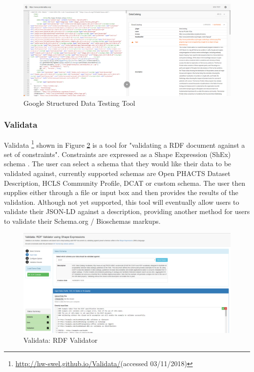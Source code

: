 \begin{figure}[h]
 \centering\includegraphics[scale=0.35]{images/google_testing.PNG}
   \caption{Google Structured Data Testing Tool}
   \label{fig:googleTool}
\end{figure}

\newpage
\subsubsection*{Validata}
Validata \footnote{\url{http://hw-swel.github.io/Validata/}(accessed 03/11/2018)} shown in Figure \ref{fig:validata} is a tool for "validating a RDF document against a set of constraints"\cite{hansen2015validata}. Constraints are expressed as a Shape Expression (ShEx) schema \cite{validataAG}. The user can select a schema that they would like their data to be validated against, currently supported schemas are Open PHACTS Dataset Description, HCLS Community Profile, DCAT or custom schema. The user then supplies either through a file or input box and then provides the results of the validation. Although not yet supported, this tool will eventually allow users to validate their JSON-LD against a description, providing another method for users to validate their Schema.org / Bioschemas markups.\newline

\begin{figure}[h]
 \centering\includegraphics[scale=0.35]{images/validata.PNG}
   \caption{Validata: RDF Validator}
   \label{fig:validata}
\end{figure}

